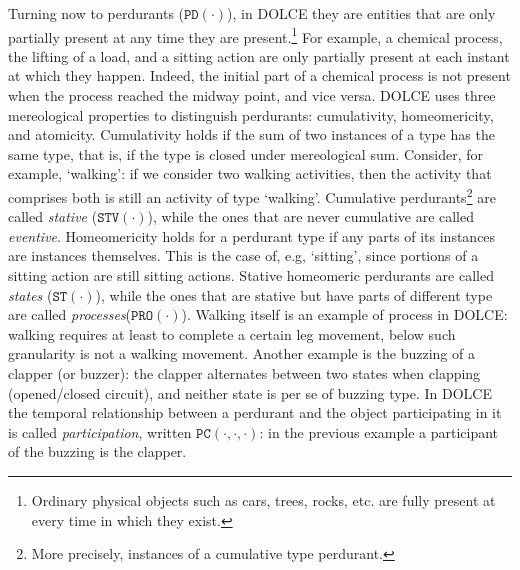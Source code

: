 \documentclass[sw]{iosart2x}
\newcommand{\generalStyle}[1]{\texttt{#1}}
\newcommand{\uniRel}[2]{\generalStyle{#1}(#2)}
\newcommand{\triRel}[4]{\generalStyle{#1}(#2,#3,#4)}
\newcommand{\DOLCE}{\textsc{DOLCE}\xspace} %
\newcommand{\DOLCEState}[1]{\uniRel{{ST}}{#1}}
\newcommand{\DOLCEProcess}[1]{\uniRel{PRO}{#1}}
\newcommand{\DOLCEPerdurant}[1]{\uniRel{{PD}}{#1}}
\newcommand{\DOLCEStative}[1]{\uniRel{{STV}}{#1}}
\newcommand{\DOLCEPC}[3]{\triRel{{PC}}{#1}{#2}{#3}}
\newcommand{\firstTimeKeyWord}[1]{\textit{#1}}
\newcommand{\quotes}[1]{`#1'}
\begin{document}
Turning now to perdurants ($\DOLCEPerdurant{\cdot}$), in \DOLCE they are entities that are only partially present at any time they are present.\footnote{Ordinary physical objects such as cars, trees, rocks, etc. are fully present at every time in which they exist.} For example, a chemical process, the lifting of a load, and a sitting action are only partially present at each instant at which they happen. Indeed, the initial part of a chemical process is not present when the process reached the midway point, and vice versa.  \DOLCE uses three mereological properties to distinguish perdurants: cumulativity, homeomericity, and atomicity.
Cumulativity holds if the sum of two instances of a type has the same type, that is, if the type is closed under mereological sum. Consider, for example, \quotes{walking}: if we consider two walking activities, then the activity that comprises both is still an activity of type \quotes{walking}.
Cumulative perdurants\footnote{More precisely, instances of a cumulative type perdurant.} are called \firstTimeKeyWord{stative} ($\DOLCEStative{\cdot}$), while the ones that are never cumulative are called \firstTimeKeyWord{eventive}.
Homeomericity holds for a perdurant type if any parts of its instances are instances themselves.
This is the case of, e.g, \quotes{sitting}, since portions of a sitting action are still sitting actions.
Stative homeomeric perdurants are called \firstTimeKeyWord{states} ($\DOLCEState{\cdot}$), while the ones that are stative but have parts of different type are called \firstTimeKeyWord{processes}($\DOLCEProcess{\cdot}$). Walking itself is an example of process in \DOLCE: walking requires at least to complete a certain leg movement, below such granularity is not a walking movement.
Another example is the buzzing of a clapper (or buzzer): the clapper alternates between two states when clapping (opened/closed circuit), and neither state is per se of buzzing type. In \DOLCE the temporal relationship between a perdurant and the object participating in it is called \firstTimeKeyWord{participation}, written $\DOLCEPC{\cdot}{\cdot}{\cdot}$: in the previous example a participant of the buzzing is the clapper.
\end{document}

